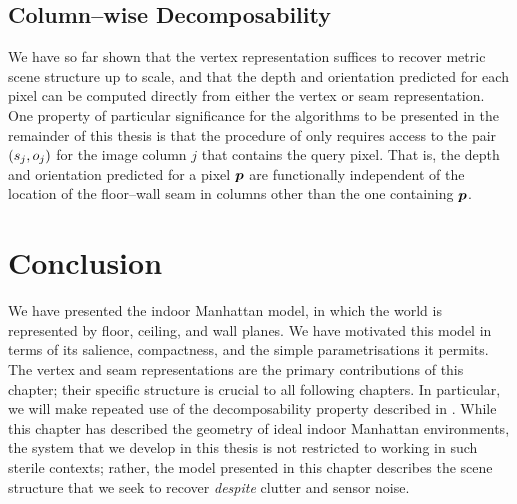 \subsection{Column--wise Decomposability}
\label{sec:col-decomposability}

We have so far shown that the vertex representation suffices to
recover metric scene structure up to scale, and that the depth and
orientation predicted for each pixel can be computed directly from
either the vertex or seam representation. One property of particular
significance for the algorithms to be presented in the remainder of
this thesis is that the procedure of  only
requires access to the pair $(\seam_j,\WallOrient_j)$ for the image
column $j$ that contains the query pixel. That is, the depth and
orientation predicted for a pixel $\Pixel$ are functionally
independent of the location of the floor--wall seam in columns other
than the one containing $\Pixel$.

\section{Conclusion}

We have presented the indoor Manhattan model, in which the world is
represented by floor, ceiling, and wall planes. We have motivated this
model in terms of its salience, compactness, and the simple
parametrisations it permits. The vertex and seam representations are
the primary contributions of this chapter; their specific structure is
crucial to all following chapters. In particular, we will make
repeated use of the decomposability property described in
. While this chapter has described the
geometry of ideal indoor Manhattan environments, the system that we
develop in this thesis is not restricted to working in such sterile
contexts; rather, the model presented in this chapter describes the
scene structure that we seek to recover \textit{despite} clutter and
sensor noise.
